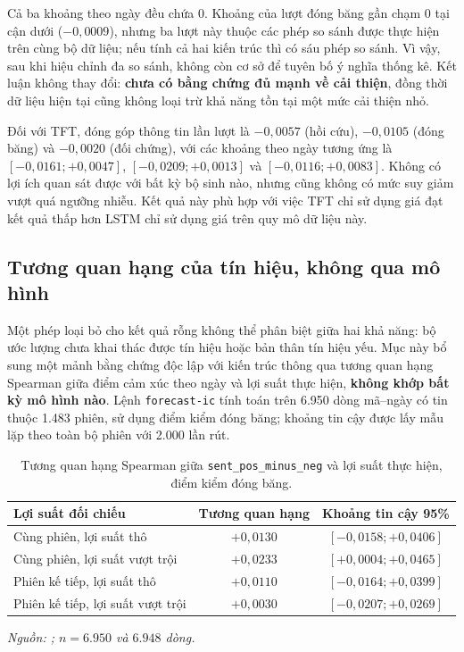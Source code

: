 \documentclass[12pt, a4paper, oneside]{report}
\begin{document}
Cả ba khoảng theo ngày đều chứa 0. Khoảng của lượt đóng băng gần chạm 0 tại cận dưới
($-0{,}0009$), nhưng ba lượt này thuộc các phép so sánh được thực hiện trên cùng bộ
dữ liệu; nếu tính cả hai kiến trúc thì có sáu phép so sánh. Vì vậy, sau khi hiệu chỉnh đa so sánh, không còn cơ sở
để tuyên bố ý nghĩa thống kê. Kết luận không thay đổi: \textbf{chưa có bằng chứng đủ mạnh
về cải thiện}, đồng thời dữ liệu hiện tại cũng không loại trừ khả năng tồn tại một mức cải thiện nhỏ.

Đối với TFT, đóng góp thông tin lần lượt là $-0{,}0057$ (hồi cứu), $-0{,}0105$ (đóng băng) và
$-0{,}0020$ (đối chứng), với các khoảng theo ngày tương ứng là $[-0{,}0161; +0{,}0047]$,
$[-0{,}0209; +0{,}0013]$ và $[-0{,}0116; +0{,}0083]$. Không có lợi ích quan sát được với bất
kỳ bộ sinh nào, nhưng cũng không có mức suy giảm vượt quá ngưỡng nhiễu. Kết quả này phù hợp với
việc TFT chỉ sử dụng giá đạt kết quả thấp hơn LSTM chỉ sử dụng giá trên quy mô dữ liệu này.

\subsection{Tương quan hạng của tín hiệu, không qua mô hình}
\label{sec:kq-ic}

Một phép loại bỏ cho kết quả rỗng không thể phân biệt giữa hai khả năng: bộ ước lượng chưa khai
thác được tín hiệu hoặc bản thân tín hiệu yếu. Mục này bổ sung một mảnh bằng chứng độc lập với kiến trúc thông qua tương quan hạng Spearman giữa điểm cảm xúc theo ngày và lợi suất thực hiện,
\textbf{không khớp bất kỳ mô hình nào}. Lệnh \texttt{forecast-ic} tính toán trên 6.950 dòng
mã--ngày có tin thuộc 1.483 phiên, sử dụng điểm kiểm đóng băng; khoảng tin cậy được lấy mẫu lặp
theo toàn bộ phiên với 2.000 lần rút.

\begin{table}[H]
  \centering
  \caption{Tương quan hạng Spearman giữa \texttt{sent\_pos\_minus\_neg} và lợi suất thực hiện, điểm kiểm đóng băng.}
  \label{tab:kq-ic}
  \begin{tabular}{l c c}
    \toprule
    Lợi suất đối chiếu & Tương quan hạng & Khoảng tin cậy 95\% \\
    \midrule
    Cùng phiên, lợi suất thô & $+0{,}0130$ & $[-0{,}0158; +0{,}0406]$ \\
    Cùng phiên, lợi suất vượt trội & $+0{,}0233$ & $[+0{,}0004; +0{,}0465]$ \\
    Phiên kế tiếp, lợi suất thô & $+0{,}0110$ & $[-0{,}0164; +0{,}0399]$ \\
    Phiên kế tiếp, lợi suất vượt trội & $+0{,}0030$ & $[-0{,}0207; +0{,}0269]$ \\
    \bottomrule
  \end{tabular}
\noindent\textit{Nguồn: ; $n = 6.950$ và $6.948$ dòng.}
\end{table}
\end{document}
